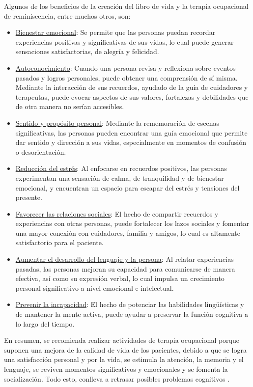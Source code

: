 Algunos de los beneficios de la creación del libro de vida y la terapia ocupacional de reminiscencia, entre muchos otros, son:\\
\begin{itemize}
	\item \underline{Bienestar emocional}: Se permite que las personas puedan recordar experiencias positivas y significativas de sus vidas, lo cual puede generar sensaciones satisfactorias, de alegría y felicidad.\\
	\item \underline{Autoconocimiento}: Cuando una persona revisa y reflexiona sobre eventos pasados y logros personales, puede obtener una comprensión de sí misma. Mediante la interacción de sus recuerdos, ayudado de la guía de cuidadores y terapeutas, puede evocar aspectos de sus valores, fortalezas y debilidades que de otra manera no serían accesibles.
	\item \underline{Sentido y propósito personal}: Mediante la rememoración de escenas significativas, las personas pueden encontrar una guía emocional que permite dar sentido y dirección a sus vidas, especialmente en momentos de confusión o desorientación.
	\item \underline{Reducción del estrés}: Al enfocarse en recuerdos positivos, las personas experimentan una sensación de calma, de tranquilidad y de bienestar emocional, y encuentran un espacio para escapar del estrés y tensiones del presente.
	\item \underline{Favorecer las relaciones sociales}: El hecho de compartir recuerdos y experiencias con otras personas, puede fortalecer los lazos sociales y fomentar una mayor conexión con cuidadores, familia y amigos, lo cual es altamente satisfactorio para el paciente.
	\item \underline{Aumentar el desarrollo del lenguaje y la persona}: Al relatar experiencias pasadas, las personas mejoran su capacidad para comunicarse de manera efectiva, así como su expresión verbal, lo cual impulsa un crecimiento personal significativo a nivel emocional e intelectual.
	\item \underline{Prevenir la incapacidad}: El hecho de potenciar las habilidades lingüísticas y de mantener la mente activa, puede ayudar a preservar la función cognitiva a lo largo del tiempo. 
\end{itemize}



En resumen, se recomienda realizar actividades de terapia ocupacional porque suponen una mejora de la calidad de vida de los pacientes, debido a que se logra una satisfacción personal y por la vida, se estimula la atención, la memoria y el lenguaje, se reviven momentos significativos y emocionales y se fomenta la socialización. Todo esto, conlleva a retrasar posibles problemas cognitivos \citep{SAS2020}.\\

